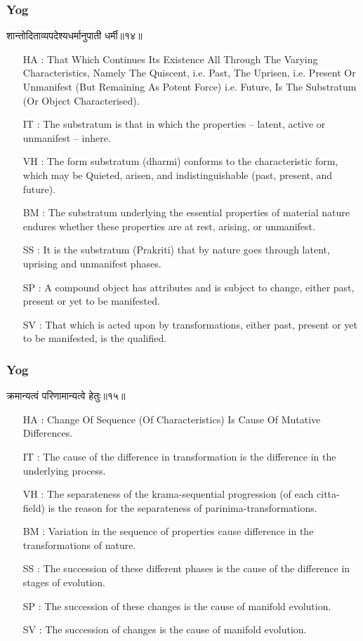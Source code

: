 \begin{frame}[fragile]\frametitle{Yog}
\begin{sanskrit}
शान्तोदिताव्यपदेश्यधर्मानुपाती धर्मी॥१४॥
\end{sanskrit}

	\begin{itemize}
	\item [HA]: That Which Continues Its Existence All Through The Varying Characteristics, Namely The Quiscent, i.e. Past, The Uprisen, i.e. Present Or Unmanifest (But Remaining As Potent Force) i.e. Future, Is The Substratum (Or Object Characterised).
	\item [IT]: The substratum is that in which the properties – latent, active or unmanifest – inhere.
	\item [VH]: The form substratum (dharmi) conforms to the characteristic form, which may be Quieted, arisen, and indistinguishable (past, present, and future).
	\item [BM]: The substratum underlying the essential properties of material nature endures whether these properties are at rest, arising, or unmanifest.
	\item [SS]: It is the substratum (Prakriti) that by nature goes through latent, uprising and unmanifest phases.
	\item [SP]: A compound object has attributes and is subject to change, either past, present or yet to be manifested.
	\item [SV]: That which is acted upon by transformations, either past, present or yet to be manifested, is the qualified. 
	\end{itemize}
\end{frame}

\begin{frame}[fragile]\frametitle{Yog}
\begin{sanskrit}
क्रमान्यत्वं परिणामान्यत्वे हेतुः॥१५॥
\end{sanskrit}

	\begin{itemize}
	\item [HA]: Change Of Sequence (Of Characteristics) Is Cause Of Mutative Differences.
	\item [IT]: The cause of the difference in transformation is the difference in the underlying process.
	\item [VH]: The separateness of the krama-sequential progression (of each citta-field) is the reason for the separateness of parinima-transformations.
	\item [BM]: Variation in the sequence of properties cause difference in the transformations of nature.
	\item [SS]: The succession of these different phases is the cause of the difference in stages of evolution.
	\item [SP]: The succession of these changes is the cause of manifold evolution.
	\item [SV]: The succession of changes is the cause of manifold evolution. 
	\end{itemize}
\end{frame}


